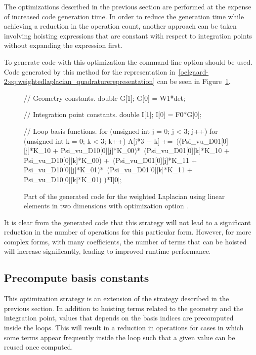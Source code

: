 The optimizations described in the previous section are performed at
the expense of increased code generation time.  In order to reduce the
generation time while achieving a reduction in the operation count,
another approach can be taken involving hoisting expressions that are
constant with respect to integration points without expanding the
expression first.

To generate code with this optimization the \ffc{} command-line option
 should be used.  Code generated by this
method for the representation
in~\eqref{oelgaard-2:eq:weightedlaplacian_quadraturerepresentation}
can be seen in Figure~\ref{oelgaard-2:fig:O_ip_code}.

\begin{figure}
\begin{c++}
// Geometry constants.
double G[1];
G[0] = W1*det;

// Integration point constants.
double I[1];
I[0] = F0*G[0];

// Loop basis functions.
for (unsigned int j = 0; j < 3; j++)
{
  for (unsigned int k = 0; k < 3; k++)
  {
    A[j*3 + k] +=\
    ((Psi_vu_D01[0][j]*K_10 + Psi_vu_D10[0][j]*K_00)*\
     (Psi_vu_D01[0][k]*K_10 + Psi_vu_D10[0][k]*K_00) +\
     (Psi_vu_D01[0][j]*K_11 + Psi_vu_D10[0][j]*K_01)*\
     (Psi_vu_D01[0][k]*K_11 + Psi_vu_D10[0][k]*K_01)
    )*I[0];
  }
}
\end{c++}
\caption{Part of the generated code for the weighted Laplacian using
  linear elements in two dimensions with optimization option .}
\label{oelgaard-2:fig:O_ip_code}
\end{figure}

It is clear from the generated code that this strategy will not lead
to a significant reduction in the number of operations for this
particular form. However, for more complex forms, with many
coefficients, the number of terms that can be hoisted will increase
significantly, leading to improved runtime performance.

\subsection{Precompute basis constants}

This optimization strategy is an extension of the strategy described
in the previous section. In addition to hoisting terms related to the
geometry and the integration point, values that depends on the basis
indices are precomputed inside the loops.  This will result in a
reduction in operations for cases in which some terms appear
frequently inside the loop such that a given value can be reused once
computed.

